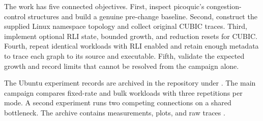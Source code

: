 The work has five connected objectives. First, inspect picoquic's congestion-control structures and build a genuine pre-change baseline. Second, construct the supplied Linux namespace topology and collect original CUBIC traces. Third, implement optional RLI state, bounded growth, and reduction resets for CUBIC. Fourth, repeat identical workloads with RLI enabled and retain enough metadata to trace each graph to its source and executable. Fifth, validate the expected growth and record limits that cannot be resolved from the campaign alone.


The Ubuntu experiment records are archived in the repository under . The main campaign compares fixed-rate and bulk workloads with three repetitions per mode. A second experiment runs two competing connections on a shared bottleneck. The archive contains measurements, plots, and raw traces \cite{ref13}.


\label{sec:introduction-end}
